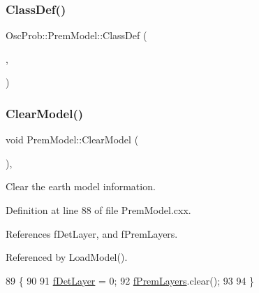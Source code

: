 \subsubsection{\texorpdfstring{Class\+Def()}{ClassDef()}}
{\footnotesize\ttfamily Osc\+Prob\+::\+Prem\+Model\+::\+Class\+Def (\begin{DoxyParamCaption}\item[{\hyperlink{classOscProb_1_1PremModel}{Prem\+Model}}]{,  }\item[{1}]{ }\end{DoxyParamCaption})\hspace{0.3cm}{\ttfamily [protected]}}

\mbox{\label{classOscProb_1_1PremModel_aaead53a9385bda9b0219fd051d0cdd11}} 
\subsubsection{\texorpdfstring{Clear\+Model()}{ClearModel()}}
{\footnotesize\ttfamily void Prem\+Model\+::\+Clear\+Model (\begin{DoxyParamCaption}{ }\end{DoxyParamCaption})\hspace{0.3cm}{\ttfamily [protected]}, {\ttfamily [virtual]}}

Clear the earth model information. 

Definition at line 88 of file Prem\+Model.\+cxx.



References f\+Det\+Layer, and f\+Prem\+Layers.



Referenced by Load\+Model().


\begin{DoxyCode}
89 \{
90 
91   \hyperlink{classOscProb_1_1PremModel_a4fb68506493666349f418b893a996185}{fDetLayer} = 0;
92   \hyperlink{classOscProb_1_1PremModel_a19a9a3b23ec154ad7a29f92b74aa5bc6}{fPremLayers}.clear();
93 
94 \}
\end{DoxyCode}
\mbox{\label{classOscProb_1_1PremModel_ac69162cc5e3c8b7c1b8a85571ff2063b}} 
